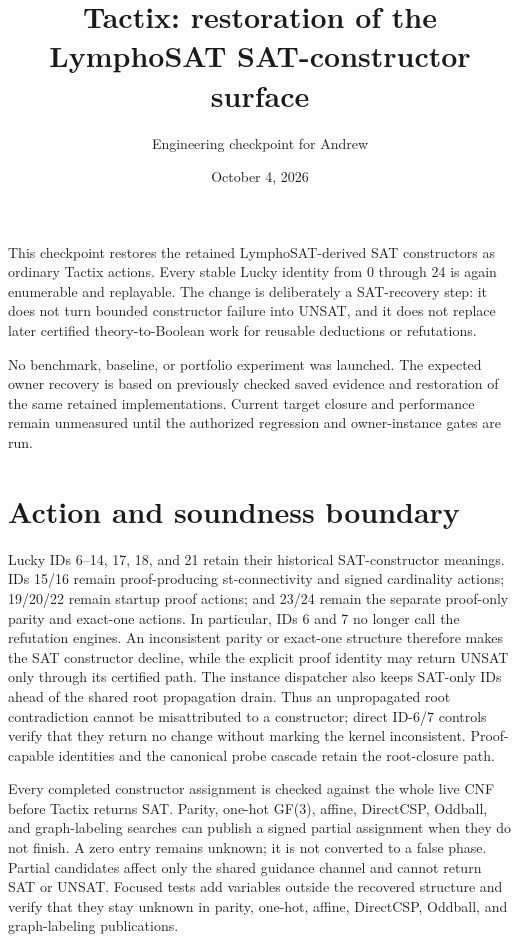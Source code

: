 \documentclass[11pt]{article}
\title{Tactix: restoration of the LymphoSAT SAT-constructor surface}
\author{Engineering checkpoint for Andrew}
\date{October 4, 2026}
\begin{document}
\maketitle

This checkpoint restores the retained LymphoSAT-derived SAT constructors as
ordinary Tactix actions.  Every stable Lucky identity from 0 through 24 is
again enumerable and replayable.  The change is deliberately a SAT-recovery
step: it does not turn bounded constructor failure into UNSAT, and it does not
replace later certified theory-to-Boolean work for reusable deductions or
refutations.

No benchmark, baseline, or portfolio experiment was launched.  The expected
owner recovery is based on previously checked saved evidence and restoration
of the same retained implementations.  Current target closure and performance
remain unmeasured until the authorized regression and owner-instance gates are
run.

\section*{Action and soundness boundary}

Lucky IDs 6--14, 17, 18, and 21 retain their historical SAT-constructor
meanings.  IDs 15/16 remain proof-producing st-connectivity and signed
cardinality actions; 19/20/22 remain startup proof actions; and 23/24 remain
the separate proof-only parity and exact-one actions.  In particular, IDs 6
and 7 no longer call the refutation engines.  An inconsistent parity or
exact-one structure therefore makes the SAT constructor decline, while the
explicit proof identity may return UNSAT only through its certified path.
The instance dispatcher also keeps SAT-only IDs ahead of the shared root
propagation drain.  Thus an unpropagated root contradiction cannot be
misattributed to a constructor; direct ID-6/7 controls verify that they return
no change without marking the kernel inconsistent.  Proof-capable identities
and the canonical probe cascade retain the root-closure path.

Every completed constructor assignment is checked against the whole live CNF
before Tactix returns SAT.  Parity, one-hot GF(3), affine, DirectCSP, Oddball,
and graph-labeling searches can publish a signed partial assignment when they
do not finish.  A zero entry remains unknown; it is not converted to a false
phase.  Partial candidates affect only the shared guidance channel and cannot
return SAT or UNSAT.  Focused tests add variables outside the recovered
structure and verify that they stay unknown in parity, one-hot, affine,
DirectCSP, Oddball, and graph-labeling publications.
\end{document}

